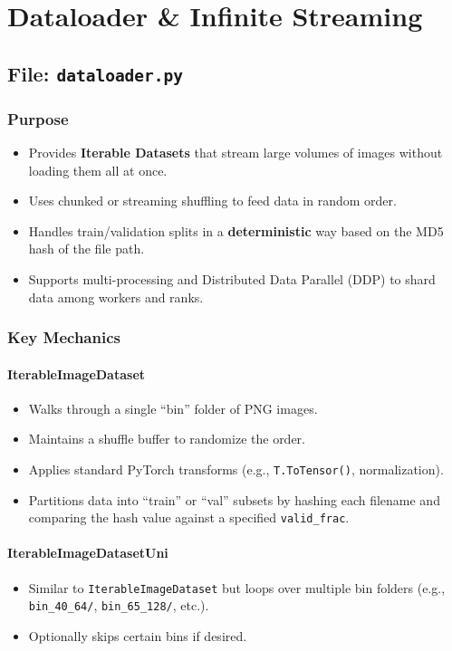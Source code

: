 \documentclass[11pt]{article}
\begin{document}
\section{Dataloader \& Infinite Streaming}

\subsection*{File: \texttt{dataloader.py}}

\subsubsection*{Purpose}

\begin{itemize}
  \item Provides \textbf{Iterable Datasets} that stream large volumes of images without loading them all at once.
  \item Uses chunked or streaming shuffling to feed data in random order.
  \item Handles train/validation splits in a \textbf{deterministic} way based on the MD5 hash of the file path.
  \item Supports multi-processing and Distributed Data Parallel (DDP) to shard data among workers and ranks.
\end{itemize}

\subsubsection*{Key Mechanics}

\paragraph{IterableImageDataset}
\begin{itemize}
  \item Walks through a single ``bin'' folder of PNG images.
  \item Maintains a shuffle buffer to randomize the order.
  \item Applies standard PyTorch transforms (e.g., \texttt{T.ToTensor()}, normalization).
  \item Partitions data into ``train'' or ``val'' subsets by hashing each filename and comparing the hash value against a specified \texttt{valid\_frac}.
\end{itemize}

\paragraph{IterableImageDatasetUni}
\begin{itemize}
  \item Similar to \texttt{IterableImageDataset} but loops over multiple bin folders (e.g., \texttt{bin\_40\_64/}, \texttt{bin\_65\_128/}, etc.).
  \item Optionally skips certain bins if desired.
\end{itemize}
\end{document}

